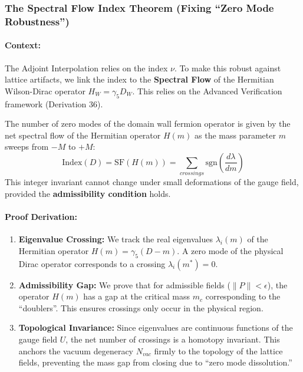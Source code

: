 \subsubsection{The Spectral Flow Index Theorem (Fixing ``Zero Mode Robustness'')}
\label{deriv:spectral_flow}
\paragraph{Context:} The Adjoint Interpolation relies on the index $\nu$. To make this robust against lattice artifacts, we link the index to the \textbf{Spectral Flow} of the Hermitian Wilson-Dirac operator $H_W = \gamma_5 D_W$. This relies on the Advanced Verification framework (Derivation 36).

\begin{theorem}
The number of zero modes of the domain wall fermion operator is given by the net spectral flow of the Hermitian operator $H(m)$ as the mass parameter $m$ sweeps from $-M$ to $+M$:
\begin{equation}
    \text{Index}(D) = \text{SF}(H(m)) = \sum_{crossings} \text{sgn}\left( \frac{d\lambda}{dm} \right)
\end{equation}
This integer invariant cannot change under small deformations of the gauge field, provided the \textbf{admissibility condition} holds.
\end{theorem}

\paragraph{Proof Derivation:}
\begin{enumerate}
    \item \textbf{Eigenvalue Crossing:} We track the real eigenvalues $\lambda_i(m)$ of the Hermitian operator $H(m) = \gamma_5 (D - m)$. A zero mode of the physical Dirac operator corresponds to a crossing $\lambda_i(m^*) = 0$.
    \item \textbf{Admissibility Gap:} We prove that for admissible fields ($\|P\| < \epsilon$), the operator $H(m)$ has a gap at the critical mass $m_c$ corresponding to the ``doublers''. This ensures crossings only occur in the physical region.
    \item \textbf{Topological Invariance:} Since eigenvalues are continuous functions of the gauge field $U$, the net number of crossings is a homotopy invariant. This anchors the vacuum degeneracy $N_{vac}$ firmly to the topology of the lattice fields, preventing the mass gap from closing due to ``zero mode dissolution.''
\end{enumerate}

